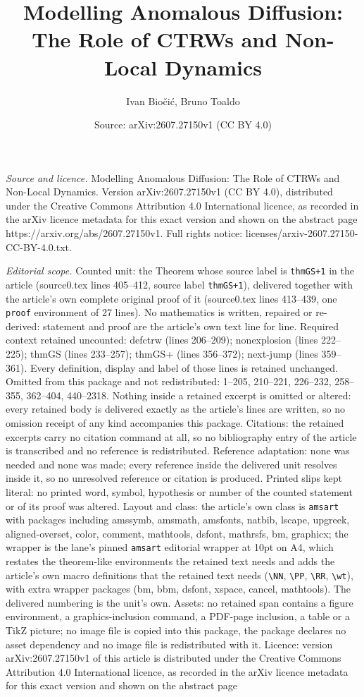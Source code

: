 \documentclass[10pt,a4paper]{amsart}
\title[Modelling Anomalous Diffusion: The Role of CTRWs and Non-Loc]{Modelling Anomalous Diffusion: The Role of CTRWs and Non-Local Dynamics}
\author{Ivan Bio\v{c}i\'{c}, Bruno Toaldo}
\date{Source: arXiv:2607.27150v1 (CC BY 4.0)}
\begin{document}
\maketitle

\noindent\emph{Source and licence.} Modelling Anomalous Diffusion: The Role of CTRWs and Non-Local Dynamics. Version arXiv:2607.27150v1 (CC BY 4.0), distributed under the Creative Commons Attribution 4.0 International licence, as recorded in the arXiv licence metadata for this exact version and shown on the abstract page https://arxiv.org/abs/2607.27150v1. Full rights notice: licenses/arxiv-2607.27150-CC-BY-4.0.txt.\par\smallskip

\noindent\textit{Editorial scope.} Counted unit: the Theorem whose source label is \texttt{thmGS+1} in the article (source0.tex lines 405--412, source label \texttt{thmGS+1}), delivered together with the article's own complete original proof of it (source0.tex lines 413--439, one \texttt{proof} environment of 27 lines). No mathematics is written, repaired or re-derived: statement and proof are the article's own text line for line. Required context retained uncounted: defctrw (lines 206--209); nonexplosion (lines 222--225); thmGS (lines 233--257); thmGS+ (lines 356--372); next-jump (lines 359--361). Every definition, display and label of those lines is retained unchanged. Omitted from this package and not redistributed: 1--205, 210--221, 226--232, 258--355, 362--404, 440--2318. Nothing inside a retained excerpt is omitted or altered: every retained body is delivered exactly as the article's lines are written, so no omission receipt of any kind accompanies this package. Citations: the retained excerpts carry no citation command at all, so no bibliography entry of the article is transcribed and no reference is redistributed. Reference adaptation: none was needed and none was made; every reference inside the delivered unit resolves inside it, so no unresolved reference or citation is produced. Printed slips kept literal: no printed word, symbol, hypothesis or number of the counted statement or of its proof was altered. Layout and class: the article's own class is \texttt{amsart} with packages including amssymb, amsmath, amsfonts, natbib, lscape, upgreek, aligned-overset, color, comment, mathtools, dsfont, mathrsfs, bm, graphicx; the wrapper is the lane's pinned \texttt{amsart} editorial wrapper at 10pt on A4, which restates the theorem-like environments the retained text needs and adds the article's own macro definitions that the retained text needs (\texttt{\textbackslash NN}, \texttt{\textbackslash PP}, \texttt{\textbackslash RR}, \texttt{\textbackslash wt}), with extra wrapper packages (bm, bbm, dsfont, xspace, cancel, mathtools). The delivered numbering is the unit's own. Assets: no retained span contains a figure environment, a graphics-inclusion command, a PDF-page inclusion, a table or a TikZ picture; no image file is copied into this package, the package declares no asset dependency and no image file is redistributed with it. Licence: version arXiv:2607.27150v1 of this article is distributed under the Creative Commons Attribution 4.0 International licence, as recorded in the arXiv licence metadata for this exact version and shown on the abstract page 
\end{document}
